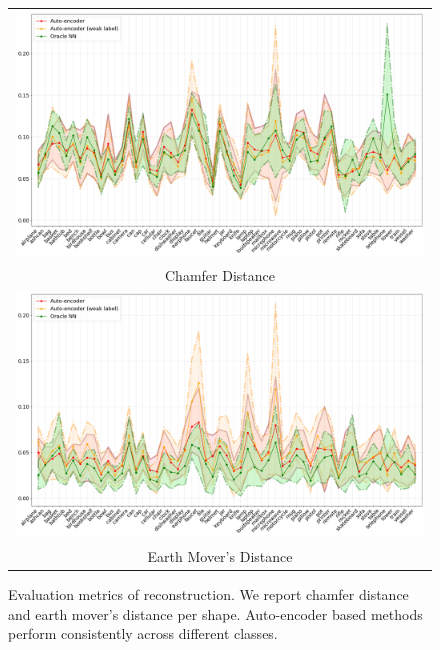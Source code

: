 \documentclass[bachelor, nocolorlinks, printoneside]{seuthesis} %
\begin{document}
\begin{Main}
\begin{figure}
\centering
\begin{tabular}{c@{}}
\includegraphics[width=0.99\columnwidth]{figs/CD_per_shape.png} \\
Chamfer Distance \\
\includegraphics[width=0.99\columnwidth]{figs/EMD_per_shape.png} \\
Earth Mover's Distance \\
\end{tabular}
\caption{Evaluation metrics of reconstruction. We report chamfer distance and earth mover's distance per shape. Auto-encoder based methods perform consistently across different classes. }
\label{fig:metric_per_class}
\end{figure}


\end{Main}
\end{document}
